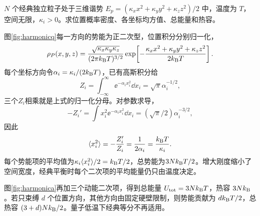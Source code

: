 \begin{exercise}[谐势阱的分布与热容]
$N$ 个经典独立粒子处于三维谐势 $E_p=(\kappa_xx^2+\kappa_yy^2+\kappa_zz^2)/2$ 中，温度为 $T$，空间无限，$\kappa_i>0$。求位置概率密度、各坐标均方值、总能量和热容。
\end{exercise}
\begin{solution}
图\ref{fig:harmonicq}每一方向的势能为正二次型，位置积分分别归一化，
\[
 \rho_P(x,y,z)=\frac{\sqrt{\kappa_x\kappa_y\kappa_z}}{(2\pi k_{\mathrm B} T)^{3/2}}
 \exp\!\left[-\frac{\kappa_xx^2+\kappa_yy^2+\kappa_zz^2}{2k_{\mathrm B} T}\right].
\]
每个坐标方向令$\alpha_i=\kappa_i/(2k_{\mathrm B} T)$，已有高斯积分给
\[
 Z_i=\int_{-\infty}^{\infty}\ee^{-\alpha_ix_i^2}\dd x_i
 =\sqrt\pi\alpha_i^{-1/2},
\]
三个$Z_i$相乘就是上式的归一化分母。对参数求导，
\[
 -Z_i'=\int x_i^2\ee^{-\alpha_ix_i^2}\dd x_i
 =(\sqrt\pi/2)\alpha_i^{-3/2},
\]
因此
\[
 \langle x_i^2\rangle=-\frac{Z_i'}{Z_i}=\frac1{2\alpha_i}
 =\frac{k_{\mathrm B} T}{\kappa_i}.
\]
每个势能项的平均值为$\kappa_i\langle x_i^2\rangle/2=k_{\mathrm B} T/2$，总势能为$3Nk_{\mathrm B} T/2$。增大刚度缩小了空间宽度，经典平衡时每个二次项的平均能量仍只由温度决定。

图\ref{fig:harmonica}再加三个动能二次项，得到总能量 $U_{\rm tot}=3Nk_{\mathrm B} T$，热容 $3Nk_{\mathrm B}$。若只束缚 $d$ 个位置方向，其他方向由固定硬壁限制，则势能贡献为 $dk_{\mathrm B} T/2$，总热容 $(3+d)Nk_{\mathrm B}/2$。量子低温下经典等分不再适用。
\end{solution}

